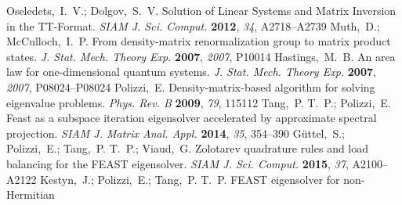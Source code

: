 \documentclass[journal=jctcce]{achemso}
\begin{document}
\begin{mcitethebibliography}{79}
{\mcitedefaultendpunct}{\mcitedefaultseppunct}\relax
\EndOfBibitem
{}
Oseledets,~I.~V.; Dolgov,~S.~V. {Solution of Linear Systems and Matrix
  Inversion in the TT-Format}. \emph{SIAM J. Sci. Comput.} \textbf{2012},
  \emph{34}, A2718--A2739\relax
\mciteBstWouldAddEndPuncttrue
\mciteSetBstMidEndSepPunct{\mcitedefaultmidpunct}
{\mcitedefaultendpunct}{\mcitedefaultseppunct}\relax
\EndOfBibitem
{}
Muth,~D.; McCulloch,~I.~P. {From density-matrix renormalization group to matrix
  product states}. \emph{J. Stat. Mech. Theory Exp.} \textbf{2007},
  \emph{2007}, P10014\relax
\mciteBstWouldAddEndPuncttrue
\mciteSetBstMidEndSepPunct{\mcitedefaultmidpunct}
{\mcitedefaultendpunct}{\mcitedefaultseppunct}\relax
\EndOfBibitem
{}
Hastings,~M.~B. {An area law for one-dimensional quantum systems}. \emph{J.
  Stat. Mech. Theory Exp.} \textbf{2007}, \emph{2007}, P08024--P08024\relax
\mciteBstWouldAddEndPuncttrue
\mciteSetBstMidEndSepPunct{\mcitedefaultmidpunct}
{\mcitedefaultendpunct}{\mcitedefaultseppunct}\relax
\EndOfBibitem
{}
Polizzi,~E. {Density-matrix-based algorithm for solving eigenvalue problems}.
  \emph{Phys. Rev. B} \textbf{2009}, \emph{79}, 115112\relax
\mciteBstWouldAddEndPuncttrue
\mciteSetBstMidEndSepPunct{\mcitedefaultmidpunct}
{\mcitedefaultendpunct}{\mcitedefaultseppunct}\relax
\EndOfBibitem
{}
Tang,~P. T.~P.; Polizzi,~E. {Feast as a subspace iteration eigensolver
  accelerated by approximate spectral projection}. \emph{SIAM J. Matrix Anal.
  Appl.} \textbf{2014}, \emph{35}, 354--390\relax
\mciteBstWouldAddEndPuncttrue
\mciteSetBstMidEndSepPunct{\mcitedefaultmidpunct}
{\mcitedefaultendpunct}{\mcitedefaultseppunct}\relax
\EndOfBibitem
{}
G{\"{u}}ttel,~S.; Polizzi,~E.; Tang,~P. T.~P.; Viaud,~G. {Zolotarev quadrature
  rules and load balancing for the FEAST eigensolver}. \emph{SIAM J. Sci.
  Comput.} \textbf{2015}, \emph{37}, A2100--A2122\relax
\mciteBstWouldAddEndPuncttrue
\mciteSetBstMidEndSepPunct{\mcitedefaultmidpunct}
{\mcitedefaultendpunct}{\mcitedefaultseppunct}\relax
\EndOfBibitem
{}
Kestyn,~J.; Polizzi,~E.; Tang,~P. T.~P. {FEAST eigensolver for non-Hermitian
}
\end{mcitethebibliography}
\end{document}
